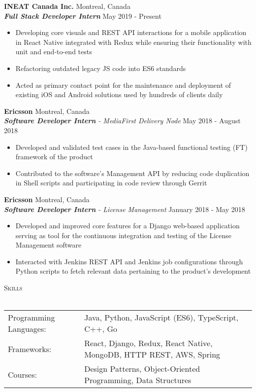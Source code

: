 \documentclass[a4paper]{article}
\newcommand{\lineunder} {
    \vspace*{-8pt} \\
    \hspace*{-18pt} \hrulefill \\
}
\newcommand{\header} [1] {
    {\hspace*{-18pt}\vspace*{6pt} \textsc{#1}}
    \vspace*{-6pt} \lineunder
}
\begin{document}
\textbf{INEAT Canada Inc.} \hfill Montreal, Canada\\
\textit{\textbf{Full Stack Developer Intern}} \hfill May 2019 - Present\\
\vspace{0.2mm}
\begin{itemize} \itemsep 0.3pt
	\item Developing core visuals and REST API interactions for a mobile application in React Native integrated with Redux while ensuring their functionality with unit and end-to-end tests
	\item Refactoring outdated legacy JS code into ES6 standards
	\item Acted as primary contact point for the maintenance and deployment of existing iOS and Android solutions used by hundreds of clients daily
\end{itemize}
\textbf{Ericsson} \hfill Montreal, Canada\\
\textit{\textbf{Software Developer Intern} - MediaFirst Delivery Node} \hfill May 2018 - August 2018\\
\vspace{0.2mm}
\begin{itemize} \itemsep 0.3pt
	\item Developed and validated test cases in the Java-based functional testing (FT) framework of the product
	\item Contributed to the software's Management API by reducing code duplication in Shell scripts and participating in code review through Gerrit
\end{itemize}
\textbf{Ericsson} \hfill Montreal, Canada\\
\textit{\textbf{Software Developer Intern} - License Management} \hfill January 2018 - May 2018\\
\vspace{0.2mm}
\begin{itemize} \itemsep 0.3pt
	\item Developed and improved core features for a Django web-based application serving as tool for the continuous integration and testing of the License Management software
	\item Interacted with Jenkins REST API and Jenkins job configurations through Python scripts to fetch relevant data pertaining to the product's development
\end{itemize}

\header{Skills}
\vspace*{2mm}
\begin{tabular}{ l l }
	Programming Languages: & Java, Python, JavaScript (ES6), TypeScript, C++, Go                             \\
	Frameworks:            & React, Django, Redux, React Native, MongoDB, HTTP REST, AWS, Spring \\
	Courses:               & Design Patterns, Object-Oriented Programming, Data Structures       \\
\end{tabular}
\vspace{2mm}
\end{document}
